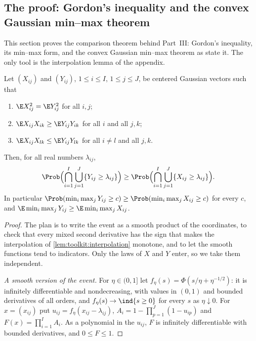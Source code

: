 \begin{refsection}
\section{The proof: Gordon's inequality and the convex Gaussian min--max theorem}\label{sec:gordon:cgmt}

This section proves the comparison theorem behind Part~III: Gordon's inequality, its min--max form, and the convex Gaussian min--max theorem as \textcite{ThrampoulidisAbbasiHassibi2018} state it. The only tool is the interpolation lemma of the appendix.

\begin{theorem}\label{thm:gordon:gordon}
Let $(X_{ij})$ and $(Y_{ij})$, $1\le i\le I$, $1\le j\le J$, be centered Gaussian vectors such that
\begin{enumerate}
\item $\E X_{ij}^2=\E Y_{ij}^2$ for all $i,j$;
\item $\E X_{ij}X_{ik}\ge\E Y_{ij}Y_{ik}$ for all $i$ and all $j,k$;
\item $\E X_{ij}X_{lk}\le\E Y_{ij}Y_{lk}$ for all $i\ne l$ and all $j,k$.
\end{enumerate}
Then, for all real numbers $\lambda_{ij}$,
\begin{equation}\label{eq:gordon:gordon}
\Prob\Bigl(\bigcap_{i=1}^I\bigcup_{j=1}^J\{Y_{ij}\ge\lambda_{ij}\}\Bigr)\ge\Prob\Bigl(\bigcap_{i=1}^I\bigcup_{j=1}^J\{X_{ij}\ge\lambda_{ij}\}\Bigr).
\end{equation}
In particular $\Prob(\min_i\max_jY_{ij}\ge c)\ge\Prob(\min_i\max_jX_{ij}\ge c)$ for every $c$, and $\E\min_i\max_jY_{ij}\ge\E\min_i\max_jX_{ij}$.
\end{theorem}

\begin{proof}
The plan is to write the event as a smooth product of the coordinates, to check that every mixed second derivative has the sign that makes the interpolation of \cref{lem:toolkit:interpolation} monotone, and to let the smooth functions tend to indicators. Only the laws of $X$ and $Y$ enter, so we take them independent.

\emph{A smooth version of the event.} For $\eta\in(0,1]$ let $f_\eta(s)=\Phi(s/\eta+\eta^{-1/2})$: it is infinitely differentiable and nondecreasing, with values in $(0,1)$ and bounded derivatives of all orders, and $f_\eta(s)\to\ind\{s\ge0\}$ for every $s$ as $\eta\downarrow0$. For $x=(x_{ij})$ put $u_{ij}=f_\eta(x_{ij}-\lambda_{ij})$, $A_i=1-\prod_{p=1}^J(1-u_{ip})$ and $F(x)=\prod_{i=1}^IA_i$. As a polynomial in the $u_{ij}$, $F$ is infinitely differentiable with bounded derivatives, and $0\le F\le1$.


\end{proof}
\end{refsection}
